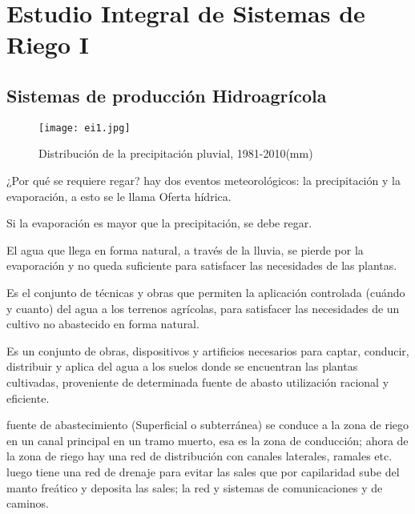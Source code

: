 \chapter{Estudio Integral de Sistemas de Riego I}

\section{Sistemas de producción Hidroagrícola}

\begin{figure}[h!]
\centering
  \texttt{[image: ei1.jpg]}
  \caption{Distribución de la precipitación pluvial, 1981-2010(mm)}
  \label{ei1}
\end{figure}
¿Por qué se requiere regar? hay dos eventos meteorológicos: la precipitación y la evaporación, a esto se le llama Oferta hídrica.
\begin{remark}
    Si la evaporación es mayor que la precipitación, se debe regar.
\end{remark}
El agua que llega en forma natural, a través de la lluvia, se pierde por la evaporación y no queda suficiente para satisfacer las necesidades de las plantas.
\begin{definition}[Irrigación]
    Es el conjunto de técnicas y obras que permiten la aplicación controlada (cuándo y cuanto) del agua a los terrenos agrícolas, para satisfacer las necesidades de un cultivo no abastecido en forma natural.
\end{definition}
\begin{definition}
    Es un conjunto de obras, dispositivos y artificios necesarios para captar, conducir, distribuir y aplica del agua a los suelos donde se encuentran las plantas cultivadas, proveniente de determinada fuente de abasto utilización racional y eficiente.
\end{definition}
fuente de abastecimiento (Superficial  o subterránea) se conduce a la zona de riego en un canal principal en un tramo muerto, esa es la zona de conducción; ahora de la zona de riego hay una red de distribución con canales laterales, ramales etc. luego tiene una red de drenaje para evitar las sales que por capilaridad sube del manto freático y deposita las sales; la red y sistemas de comunicaciones y de caminos.
